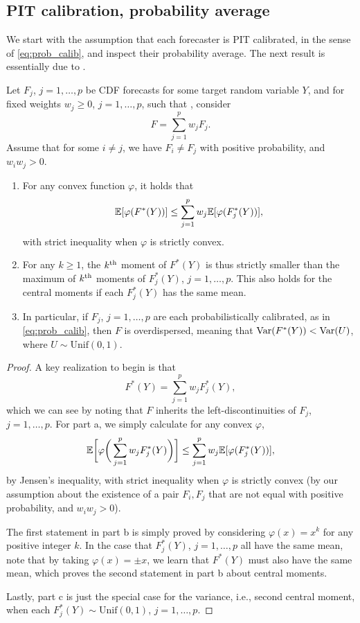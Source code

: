 \documentclass{article}
\begin{document}
\subsection{PIT calibration, probability average}

We start with the assumption that each forecaster is PIT calibrated, in the
sense of \eqref{eq:prob_calib}, and inspect their probability average. The next
result is essentially due to \citet{ranjan2010combining}.  

\begin{theorem}
\label{thm:prob_prob}
Let $F_j$, $j=1,\dots,p$ be CDF forecasts for some target random variable $Y$,
and for fixed weights $w_j \geq 0$, $j=1,\dots,p$, such that
, consider  
\[
F = \sum_{j=1}^p w_j F_j.
\]
Assume that for some $i \not= j$, we have $F_i \not= F_j$ with positive 
probability, and $w_iw_j > 0$. 

\begin{enumerate}[label=\alph*.]
\item For any convex function $\varphi$, it holds that
\[
\mathbb{E}[\varphi(F^*(Y))] \leq \sum_{j=1}^p w_j \mathbb{E}[\varphi(F_j^*(Y))], 
\]
with strict inequality when $\varphi$ is strictly convex.

\item For any $k \geq 1$, the $k^{\text{th}}$ moment of $F^*(Y)$ is thus strictly smaller 
  than the maximum of $k^{\text{th}}$ moments of $F_j^*(Y)$, $j=1,\dots,p$. This also
  holds for the central moments if each $F_j^*(Y)$ has the same mean.

\item In particular, if $F_j$, $j=1,\dots,p$ are each probabilistically
  calibrated, as in \eqref{eq:prob_calib}, then $F$ is overdispersed, meaning
  that $\mathrm{Var}(F^*(Y)) < \mathrm{Var}(U)$, where $U \sim \mathrm{Unif}(0,1)$.  
\end{enumerate}
\end{theorem}

\begin{proof}
A key realization to begin is that
\[
F^*(Y) = \sum_{j=1}^p w_j F_j^*(Y),
\]
which we can see by noting that $F$ inherits the left-discontinuities of $F_j$,
$j=1,\dots,p$. For part a, we simply calculate for any convex $\varphi$,  
\[
\mathbb{E}\bigg[\varphi\bigg( \sum_{j=1}^p w_j F_j^*(Y) \bigg)\bigg] \leq 
\sum_{j=1}^p w_j \mathbb{E}[\varphi(F_j^*(Y))],
\]
by Jensen's inequality, with strict inequality when $\varphi$ is strictly 
convex (by our assumption about the existence of a pair $F_i,F_j$ that are 
not equal with positive probability, and $w_iw_j>0$).

The first statement in part b is simply proved by considering $\varphi(x) = x^k$
for any positive integer $k$. In the case that $F_j^*(Y)$, $j=1,\dots,p$ all
have the same mean, note that by taking $\varphi(x) = \pm x$, we learn that
$F^*(Y)$ must also have the same mean, which proves the second statement in part
b about central moments.

Lastly, part c is just the special case for the variance, i.e., second central
moment, when each $F_j^*(Y) \sim \mathrm{Unif}(0,1)$, $j=1,\dots,p$.
\end{proof}
\end{document}

